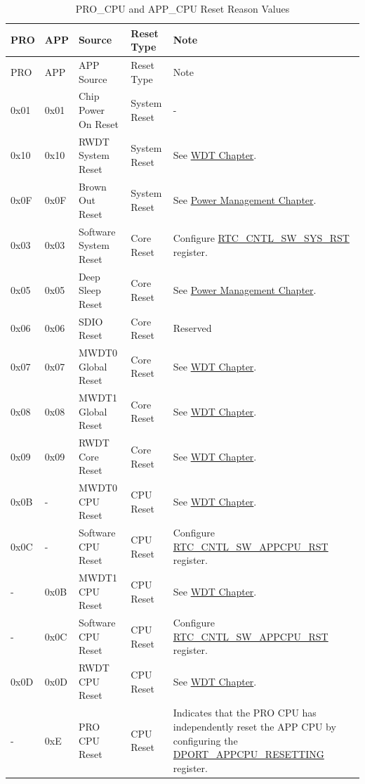 \documentclass[main\_\_EN.tex]{subfiles}
\begin{document}
\begin{longtable}[c]{ |l|l|l|l|m{8cm}| }
\caption{PRO\_CPU and APP\_CPU Reset Reason Values}
    \label{table:resetreasons}  \\
        \hline
        \rowcolor{lightgray}
        PRO & APP & Source & Reset Type & Note\\
        \hline
        \endfirsthead
        \hline
        \rowcolor{lightgray}
        PRO & APP & APP Source & Reset Type & Note \\
        \hline
        \endhead
        \endfoot
        0x01 & 0x01 & Chip Power On Reset & System Reset &  - \\
        \hline
        0x10 & 0x10 & RWDT System Reset & System Reset & See \hyperref[mod:wdt]{WDT Chapter}. \\
        \hline
        0x0F & 0x0F & Brown Out Reset & System Reset & See \hyperref[mod:lowpowm]{Power Management Chapter}.\\
        \hline
        0x03 & 0x03 & Software System Reset & Core Reset & Configure \hyperref[fielddesc:RTCCNTLSWSYSRST]{RTC\_CNTL\_SW\_SYS\_RST} register.\\
        \hline
        0x05 & 0x05 & Deep Sleep Reset & Core Reset & See \hyperref[mod:lowpowm]{Power Management Chapter}. \\
        \hline
        0x06 & 0x06 & SDIO Reset & Core Reset & Reserved
        \\\hline
        0x07 & 0x07 & MWDT0 Global Reset & Core Reset & See \hyperref[mod:wdt]{WDT Chapter}. \\
        \hline
        0x08 & 0x08 & MWDT1 Global Reset & Core Reset & See \hyperref[mod:wdt]{WDT Chapter}. \\
        \hline
        0x09 & 0x09 & RWDT Core Reset & Core Reset & See \hyperref[mod:wdt]{WDT Chapter}. \\
        \hline
        0x0B & - & MWDT0 CPU Reset & CPU Reset & See \hyperref[mod:wdt]{WDT Chapter}.  \\
        \hline
        0x0C & - & Software CPU Reset & CPU Reset &  Configure \hyperref[fielddesc:RTCCNTLSWAPPCPURST]{RTC\_CNTL\_SW\_APPCPU\_RST}        register.\\
		\hline
        - & 0x0B & MWDT1 CPU Reset & CPU Reset & See \hyperref[mod:wdt]{WDT Chapter}. \\
        \hline
        - & 0x0C & Software CPU Reset & CPU Reset &  Configure \hyperref[fielddesc:RTCCNTLSWAPPCPURST]{RTC\_CNTL\_SW\_APPCPU\_RST} register.\\
        \hline
        0x0D & 0x0D & RWDT CPU Reset & CPU Reset & See \hyperref[mod:wdt]{WDT Chapter}.\\
        \hline
        - &  0xE &  PRO CPU Reset &  CPU Reset & Indicates that the PRO CPU has independently \newline reset
        the APP CPU by configuring the \newline
        \hyperref[DPORTAPPCPURESETTING]{DPORT\_APPCPU\_RESETTING} register.\\
        \hline
    \end{longtable}
\end{document}
